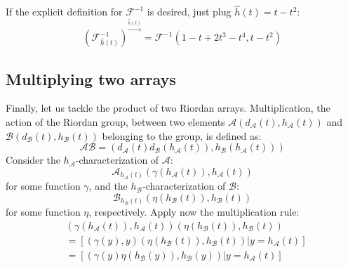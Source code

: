 If the explicit definition for $\mathcal{F}^{-1}$ is desired, just plug $\hat{h}(t)=t-t^2$:
\begin{displaymath}
    \left(\mathcal{F}_{\hat{h}(t)}^{-1}\right)^{\stackrel{\hat{h}(t)}{\rightarrow}} =
        \mathcal{F}^{-1}\left(1-t+2t^3-t^4,t-t^2\right)
\end{displaymath}

\subsection{Multiplying two arrays}

Finally, let us tackle the product of two Riordan arrays. 
Multiplication, the action of the Riordan group, between two elements 
$\mathcal{A}(d_{\mathcal{A}}(t), h_{\mathcal{A}}(t))$ and 
$\mathcal{B}(d_{\mathcal{B}}(t), h_{\mathcal{B}}(t))$ belonging to the group, is defined as:
\begin{displaymath}
    \mathcal{A}\mathcal{B} = \left(d_{\mathcal{A}}(t)d_{\mathcal{B}}(h_{\mathcal{A}}(t)),
        h_{\mathcal{B}}(h_{\mathcal{A}}(t))\right)
\end{displaymath}
Consider the $h_{\mathcal{A}}$-characterization of $\mathcal{A}$:
\begin{displaymath}
    \mathcal{A}_{h_\mathcal{A}(t)} \left(\gamma(h_{\mathcal{A}}(t)), h_{\mathcal{A}}(t)  \right)
\end{displaymath}
for some function $\gamma$, and the $h_{\mathcal{B}}$-characterization of $\mathcal{B}$:
\begin{displaymath}
    \mathcal{B}_{h_\mathcal{B}(t)} \left(\eta(h_{\mathcal{B}}(t)), h_{\mathcal{B}}(t)  \right)
\end{displaymath}
for some function $\eta$, respectively. Apply now the multiplication rule:
\begin{displaymath}
    \begin{split}
        & \left(\gamma(h_{\mathcal{A}}(t)), h_{\mathcal{A}}(t)  \right)
            \left(\eta(h_{\mathcal{B}}(t)), h_{\mathcal{B}}(t)  \right) \\
        &=\left[\left.\left(\gamma(y), y  \right)
            \left(\eta(h_{\mathcal{B}}(t)), h_{\mathcal{B}}(t)  \right) \right| y=h_{\mathcal{A}}(t) \right]\\
        &=\left[\left.\left(\gamma(y)\eta(h_{\mathcal{B}}(y)), h_{\mathcal{B}}(y)  \right) \right|
             y=h_{\mathcal{A}}(t) \right]\\
    \end{split}
\end{displaymath}
